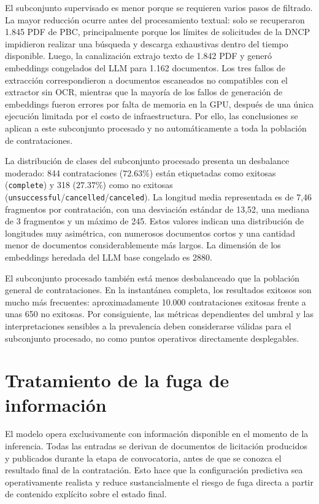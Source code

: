 El subconjunto supervisado es menor porque se requieren varios pasos de filtrado. La mayor reducción ocurre antes del procesamiento textual: solo se recuperaron 1.845 PDF de PBC, principalmente porque los límites de solicitudes de la DNCP impidieron realizar una búsqueda y descarga exhaustivas dentro del tiempo disponible. Luego, la canalización extrajo texto de 1.842 PDF y generó embeddings congelados del LLM para 1.162 documentos. Los tres fallos de extracción correspondieron a documentos escaneados no compatibles con el extractor sin OCR, mientras que la mayoría de los fallos de generación de embeddings fueron errores por falta de memoria en la GPU, después de una única ejecución limitada por el costo de infraestructura. Por ello, las conclusiones se aplican a este subconjunto procesado y no automáticamente a toda la población de contrataciones.

La distribución de clases del subconjunto procesado presenta un desbalance moderado: 844 contrataciones ($72.63\%$) están etiquetadas como exitosas (\texttt{complete}) y 318 ($27.37\%$) como no exitosas (\texttt{unsuccessful}/\texttt{cancelled}/\texttt{canceled}). La longitud media representada es de 7,46 fragmentos por contratación, con una desviación estándar de 13,52, una mediana de 3 fragmentos y un máximo de 245. Estos valores indican una distribución de longitudes muy asimétrica, con numerosos documentos cortos y una cantidad menor de documentos considerablemente más largos. La dimensión de los embeddings heredada del LLM base congelado es 2880.

El subconjunto procesado también está menos desbalanceado que la población general de contrataciones. En la instantánea completa, los resultados exitosos son mucho más frecuentes: aproximadamente 10.000 contrataciones exitosas frente a unas 650 no exitosas. Por consiguiente, las métricas dependientes del umbral y las interpretaciones sensibles a la prevalencia deben considerarse válidas para el subconjunto procesado, no como puntos operativos directamente desplegables.

\section{Tratamiento de la fuga de información}
El modelo opera exclusivamente con información disponible en el momento de la inferencia. Todas las entradas se derivan de documentos de licitación producidos y publicados durante la etapa de convocatoria, antes de que se conozca el resultado final de la contratación. Esto hace que la configuración predictiva sea operativamente realista y reduce sustancialmente el riesgo de fuga directa a partir de contenido explícito sobre el estado final.

